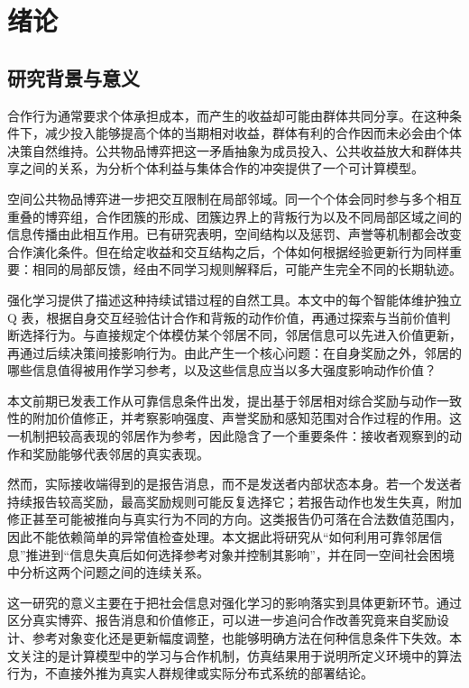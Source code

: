\chapter{绪论}
\label{chap:introduction}

\section{研究背景与意义}

合作行为通常要求个体承担成本，而产生的收益却可能由群体共同分享。在这种条件下，减少投入能够提高个体的当期相对收益，群体有利的合作因而未必会由个体决策自然维持。公共物品博弈把这一矛盾抽象为成员投入、公共收益放大和群体共享之间的关系，为分析个体利益与集体合作的冲突提供了一个可计算模型。

空间公共物品博弈进一步把交互限制在局部邻域。同一个个体会同时参与多个相互重叠的博弈组，合作团簇的形成、团簇边界上的背叛行为以及不同局部区域之间的信息传播由此相互作用。已有研究表明，空间结构以及惩罚、声誉等机制都会改变合作演化条件\cite{brandt2003punishment}。但在给定收益和交互结构之后，个体如何根据经验更新行为同样重要：相同的局部反馈，经由不同学习规则解释后，可能产生完全不同的长期轨迹。

强化学习提供了描述这种持续试错过程的自然工具\cite{sutton2018reinforcement}。本文中的每个智能体维护独立 Q 表，根据自身交互经验估计合作和背叛的动作价值，再通过探索与当前价值判断选择行为。与直接规定个体模仿某个邻居不同，邻居信息可以先进入价值更新，再通过后续决策间接影响行为。由此产生一个核心问题：在自身奖励之外，邻居的哪些信息值得被用作学习参考，以及这些信息应当以多大强度影响动作价值？

本文前期已发表工作从可靠信息条件出发，提出基于邻居相对综合奖励与动作一致性的附加价值修正，并考察影响强度、声誉奖励和感知范围对合作过程的作用\cite{kang2025neighbor}。这一机制把较高表现的邻居作为参考，因此隐含了一个重要条件：接收者观察到的动作和奖励能够代表邻居的真实表现。

然而，实际接收端得到的是报告消息，而不是发送者内部状态本身。若一个发送者持续报告较高奖励，最高奖励规则可能反复选择它；若报告动作也发生失真，附加修正甚至可能被推向与真实行为不同的方向。这类报告仍可落在合法数值范围内，因此不能依赖简单的异常值检查处理。本文据此将研究从“如何利用可靠邻居信息”推进到“信息失真后如何选择参考对象并控制其影响”，并在同一空间社会困境中分析这两个问题之间的连续关系。

这一研究的意义主要在于把社会信息对强化学习的影响落实到具体更新环节。通过区分真实博弈、报告消息和价值修正，可以进一步追问合作改善究竟来自奖励设计、参考对象变化还是更新幅度调整，也能够明确方法在何种信息条件下失效。本文关注的是计算模型中的学习与合作机制，仿真结果用于说明所定义环境中的算法行为，不直接外推为真实人群规律或实际分布式系统的部署结论。

